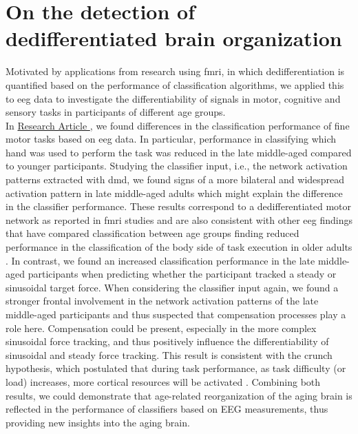 \section{On the detection of dedifferentiated brain organization}
Motivated by applications from research using \gls{fmri}, in which dedifferentiation is quantified based on the performance of classification algorithms, we applied this to \gls{eeg} data to investigate the differentiability of signals in motor, cognitive and sensory tasks in participants of different age groups.\\
In \hyperref[results:paperI]{Research Article }, we found differences in the classification performance of fine motor tasks based on \gls{eeg} data. In particular, performance in classifying which hand was used to perform the task was reduced in the late middle-aged compared to younger participants. Studying the classifier input, i.e., the network activation patterns extracted with \gls{dmd}, we found signs of a more bilateral and widespread activation pattern in late middle-aged adults which might explain the difference in the classifier performance. These results correspond to a dedifferentiated motor network as reported in \gls{fmri} studies and are also consistent with other \gls{eeg} findings that have compared classification between age groups finding reduced performance in the classification of the body side of task execution in older adults \cite{Chen2019, Zich2015, Carb2011, Cassedy2020}. In contrast, we found an increased classification performance in the late middle-aged participants when predicting whether the participant tracked a steady or sinusoidal target force. When considering the classifier input again, we found a stronger frontal involvement in the network activation patterns of the late middle-aged participants and thus suspected that compensation processes play a role here. Compensation could be present,  especially in the more complex sinusoidal force tracking, and thus positively influence the differentiability of sinusoidal and steady force tracking. This result is consistent with the \gls{crunch} hypothesis, which postulated that during task performance, as task difficulty (or load) increases, more cortical resources will be activated \cite{Festini2018}. Combining both results, we could demonstrate that age-related reorganization of the aging brain is reflected in the performance of classifiers based on EEG measurements, thus providing new insights into the aging brain.\\
